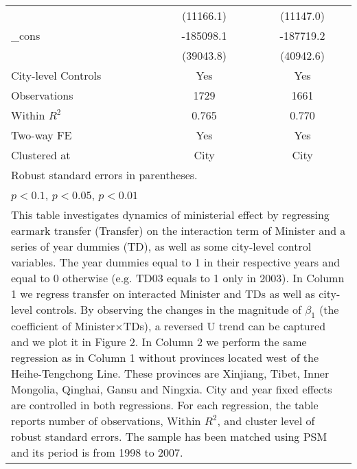 \documentclass[11pt,a4paper]{article}
\begin{document}
\begin{center}
\begin{scriptsize}
{\begin{tabular}{l*{2}{c}}
            &   (11166.1)         &   (11147.0)         \\
[1em]
\_cons      &   -185098.1\sym{***}&   -187719.2\sym{***}\\
            &   (39043.8)         &   (40942.6)         \\
City-level Controls &  Yes      &    Yes  \\            
\hline
Observations        &        1729         &        1661         \\
Within $R^{2}$       &       0.765         &       0.770         \\
Two-way FE    &  Yes    &   Yes                   \\
Clustered at    &         City         &    City  \\
\hline\hline
\multicolumn{3}{l}{\footnotesize Robust standard errors in parentheses.}\\
\multicolumn{3}{l}{\footnotesize \sym{*} \(p<0.1\), \sym{**} \(p<0.05\), \sym{***} \(p<0.01\)}\\
\multicolumn{3}{p{7.5cm}}{\footnotesize This table investigates dynamics of ministerial effect by regressing earmark transfer (Transfer) on the interaction term of Minister and a series of year dummies (TD), as well as some city-level control variables. The year dummies equal to 1 in their respective years and equal to 0 otherwise (e.g. TD03 equals to 1 only in 2003). In Column 1 we regress transfer on interacted Minister and TDs as well as city-level controls. By observing the changes in the magnitude of $\beta_{1}$ (the coefficient of Minister\(\times\)TDs), a reversed U trend can be captured and we plot it in Figure 2. In Column 2 we perform the same regression as in Column 1 without provinces located west of the Heihe-Tengchong Line. These provinces are Xinjiang, Tibet, Inner Mongolia, Qinghai, Gansu and Ningxia. City and year fixed effects are controlled in both regressions. For each regression, the table reports number of observations, Within $R^{2}$, and cluster level of robust standard errors. The sample has been matched using PSM and its period is from 1998 to 2007. }\\
\end{tabular}
}


\end{scriptsize}
\end{center}


\newpage
\end{document}

